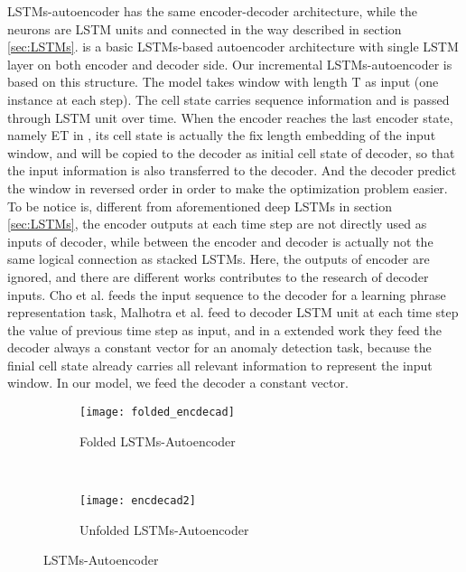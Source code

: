 LSTMs-autoencoder has the same encoder-decoder architecture, while the neurons are LSTM units and connected in the way described in section \ref{sec:LSTMs}.  is a basic LSTMs-based autoencoder architecture with single LSTM layer on both encoder and decoder side. Our incremental LSTMs-autoencoder is based on this structure. The model takes window with length T as input (one instance at each step). The cell state carries sequence information and is passed through LSTM unit over time. When the encoder reaches the last encoder state, namely ET in , its cell state is actually the fix length embedding of the input window, and will be copied to the decoder as initial cell state of decoder, so that the input information is also transferred to the decoder. And the decoder predict the window in reversed order in order to make the optimization problem easier. To be notice is, different from aforementioned deep LSTMs in section \ref{sec:LSTMs}, the encoder outputs at each time step are not directly used as inputs of decoder, while between the encoder and decoder is actually not the same logical connection as stacked LSTMs. Here, the outputs of encoder are ignored, and there are different works contributes to the research of decoder inputs. Cho et al. \cite{phraserepresentation} feeds the input sequence to the decoder for a learning phrase representation task, Malhotra et al. \cite{encdecad} feed to decoder LSTM unit at each time step the value of previous time step as input, and in a extended work \cite{timenet} they feed the decoder always a constant vector for an anomaly detection task, because the finial cell state already carries all relevant information to represent the input window. In our model, we feed the decoder a constant vector.\\

\begin{figure}[t!]
\centering
	\begin {subfigure}[t]{0.45\textwidth}
	\centering
	\texttt{[image: folded\_encdecad]}
	\caption{Folded LSTMs-Autoencoder}
	\label{fig:encdecad1}
	\end{subfigure}
	~
	\begin {subfigure}[t]{0.45\textwidth}
	\centering
	\texttt{[image: encdecad2]}
	\caption{Unfolded LSTMs-Autoencoder}
	\label{fig:encdecad2}
	\end{subfigure}
	\caption[LSTMs-Autoencoder]{LSTMs-Autoencoder}
\label{fig:encdecad}

\end{figure}






